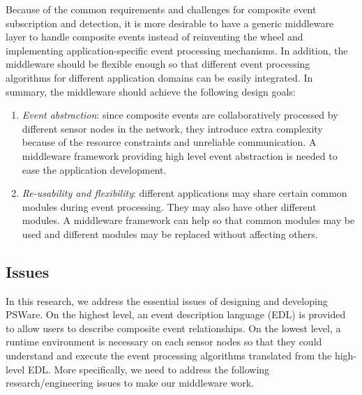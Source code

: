 Because of the common requirements and challenges for composite event subscription and detection, it is more desirable to have a generic middleware layer to handle composite events instead of reinventing the wheel and implementing application-specific event processing mechanisms. In addition, the middleware should be flexible enough so that different event processing algorithms for different application domains can be easily integrated. In summary, the middleware should achieve the following design goals:
\begin{enumerate}
\item \emph{Event abstraction}: since composite events are collaboratively processed by different sensor nodes in the network, they introduce extra complexity because of the resource constraints and unreliable communication. A middleware framework providing high level event abstraction is needed to ease the application development.
\item \emph{Re-usability and flexibility}: different applications may share certain common modules during event processing. They may also have other different modules. A middleware framework can help so that common modules may be used and different modules may be replaced without affecting others.
\end{enumerate}

\subsection{Issues}
In this research, we address the essential issues of designing and developing PSWare. On the highest level, an event description language (EDL) is provided to allow users to describe composite event relationships. On the lowest level, a runtime environment is necessary on each sensor nodes so that they could understand and execute the event processing algorithms translated from the high-level EDL. More specifically, we need to address the following research/engineering issues to make our middleware work.

